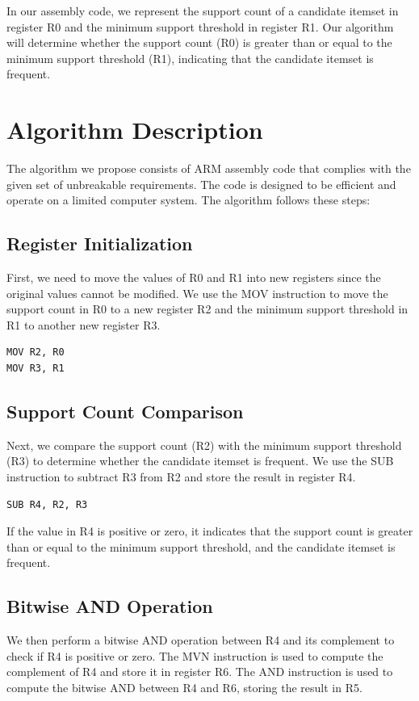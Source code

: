 In our assembly code, we represent the support count of a candidate itemset in register R0 and the minimum support threshold in register R1. Our algorithm will determine whether the support count (R0) is greater than or equal to the minimum support threshold (R1), indicating that the candidate itemset is frequent.

\section{Algorithm Description}

The algorithm we propose consists of ARM assembly code that complies with the given set of unbreakable requirements. The code is designed to be efficient and operate on a limited computer system. The algorithm follows these steps:

\subsection{Register Initialization}
First, we need to move the values of R0 and R1 into new registers since the original values cannot be modified. We use the MOV instruction to move the support count in R0 to a new register R2 and the minimum support threshold in R1 to another new register R3.

\begin{verbatim}
MOV R2, R0
MOV R3, R1
\end{verbatim}

\subsection{Support Count Comparison}
Next, we compare the support count (R2) with the minimum support threshold (R3) to determine whether the candidate itemset is frequent. We use the SUB instruction to subtract R3 from R2 and store the result in register R4.

\begin{verbatim}
SUB R4, R2, R3
\end{verbatim}

If the value in R4 is positive or zero, it indicates that the support count is greater than or equal to the minimum support threshold, and the candidate itemset is frequent.

\subsection{Bitwise AND Operation}
We then perform a bitwise AND operation between R4 and its complement to check if R4 is positive or zero. The MVN instruction is used to compute the complement of R4 and store it in register R6. The AND instruction is used to compute the bitwise AND between R4 and R6, storing the result in R5.


